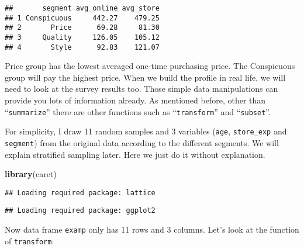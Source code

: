 \documentclass[
]{article}
\newenvironment{Shaded}{\begin{snugshade}}{\end{snugshade}}
\newcommand{\DataTypeTok}[1]{\textcolor[rgb]{0.13,0.29,0.53}{#1}}
\newcommand{\DecValTok}[1]{\textcolor[rgb]{0.00,0.00,0.81}{#1}}
\newcommand{\FloatTok}[1]{\textcolor[rgb]{0.00,0.00,0.81}{#1}}
\newcommand{\KeywordTok}[1]{\textcolor[rgb]{0.13,0.29,0.53}{\textbf{#1}}}
\newcommand{\NormalTok}[1]{#1}
\newcommand{\OperatorTok}[1]{\textcolor[rgb]{0.81,0.36,0.00}{\textbf{#1}}}
\newcommand{\StringTok}[1]{\textcolor[rgb]{0.31,0.60,0.02}{#1}}
\begin{document}
\begin{verbatim}
##       segment avg_online avg_store
## 1 Conspicuous     442.27    479.25
## 2       Price      69.28     81.30
## 3     Quality     126.05    105.12
## 4       Style      92.83    121.07
\end{verbatim}

Price group has the lowest averaged one-time purchasing price. The
Conspicuous group will pay the highest price. When we build the profile
in real life, we will need to look at the survey results too. Those
simple data manipulations can provide you lots of information already.
As mentioned before, other than ``\texttt{summarize}'' there are other
functions such as ``\texttt{transform}'' and ``\texttt{subset}''.

For simplicity, I draw 11 random samples and 3 variables (\texttt{age},
\texttt{store\_exp} and \texttt{segment}) from the original data
according to the different segments. We will explain stratified sampling
later. Here we just do it without explanation.

\begin{Shaded}
\begin{Highlighting}[]
\KeywordTok{library}\NormalTok{(caret)}
\end{Highlighting}
\end{Shaded}

\begin{verbatim}
## Loading required package: lattice
\end{verbatim}

\begin{verbatim}
## Loading required package: ggplot2
\end{verbatim}

\begin{Shaded}
\end{Shaded}

Now data frame \texttt{examp} only has 11 rows and 3 columns. Let's look
at the function of \texttt{transform}:
\end{document}
